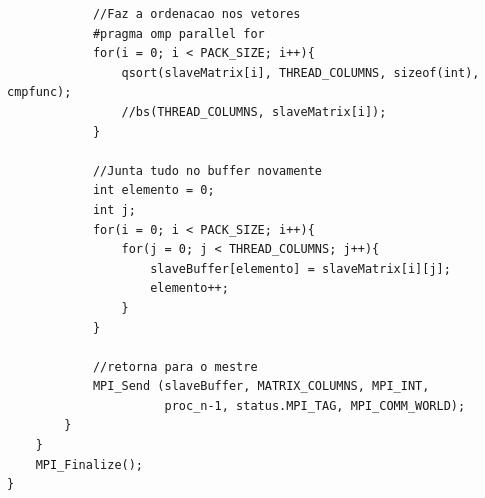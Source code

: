 \documentclass[12pt]{article}
\begin{document}
\begin{lstlisting}
            //Faz a ordenacao nos vetores
            #pragma omp parallel for
            for(i = 0; i < PACK_SIZE; i++){
                qsort(slaveMatrix[i], THREAD_COLUMNS, sizeof(int), cmpfunc);
            	//bs(THREAD_COLUMNS, slaveMatrix[i]);
	    	}

            //Junta tudo no buffer novamente            
            int elemento = 0;
            int j;
            for(i = 0; i < PACK_SIZE; i++){
                for(j = 0; j < THREAD_COLUMNS; j++){
                    slaveBuffer[elemento] = slaveMatrix[i][j];
                    elemento++;
                }
            }

            //retorna para o mestre
            MPI_Send (slaveBuffer, MATRIX_COLUMNS, MPI_INT,
                      proc_n-1, status.MPI_TAG, MPI_COMM_WORLD);
        }
    }
    MPI_Finalize();
}
\end{lstlisting}
\end{document}
